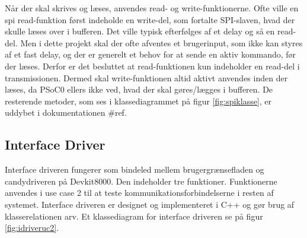 Når der skal skrives og læses, anvendes read- og write-funktionerne. Ofte ville en spi read-funktion først indeholde en write-del, som fortalte SPI-slaven, hvad der skulle læses over i bufferen. Det ville typisk efterfølges af et delay og så en read-del. Men i dette projekt skal der ofte afventes et brugerinput, som ikke kan styres af et fast delay, og der er generelt et behov for at sende en aktiv kommando, før der læses. Derfor er det besluttet at read-funktionen kun indeholder en read-del i transmissionen. Dermed skal write-funktionen altid aktivt anvendes inden der læses, da PSoC0 ellers ikke ved, hvad der skal gøres/lægges i bufferen. De resterende metoder, som ses i klassediagrammet på figur \ref{fig:spiklasse}, er uddybet i dokumentationen \#ref.\\


\subsection{Interface Driver}
Interface driveren fungerer som bindeled mellem brugergrænsefladen og candydriveren på Devkit8000. Den indeholder tre funktioner. Funktionerne anvendes i use case 2 til at teste kommunikationsforbindelserne i resten af systemet. Interface driveren er designet og implementeret i C++ og gør brug af klasserelationen arv. Et klassediagram for interface driveren se på figur  \ref{fig:idriveruc2}.\\

